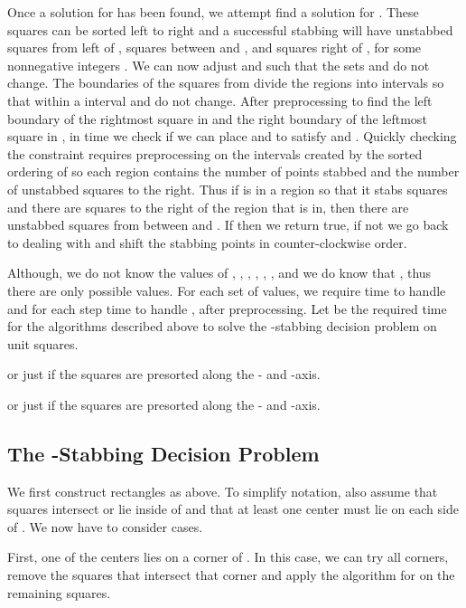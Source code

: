 \documentclass[11pt]{myclass}
\begin{document}
Once a solution for  has been found, we attempt find a solution for .  These squares can be sorted left to right and a successful stabbing will have  unstabbed squares from  left of ,  squares between  and , and  squares right of , for some nonnegative integers .  We can now adjust  and  such that the sets  and  do not change.  The boundaries of the squares from  divide the regions into intervals so that within a interval  and  do not change.  After preprocessing to find the left boundary of the rightmost square in  and the right boundary of the leftmost square in , in  time we check if we can place  and  to satisfy  and .  
Quickly checking the  constraint requires preprocessing on the intervals created by the sorted ordering of  so each region contains the number of points stabbed and the number of unstabbed squares to the right.  Thus if  is in a region so that it stabs  squares and there are  squares to the right of the region that  is in, then there are  unstabbed squares from  between  and .  If  then we return true, if not we go back to dealing with  and shift the stabbing points in counter-clockwise order.  

Although, we do not know the values of , , , , , , and  we do know that , thus there are only  possible values.  
For each set of values, we require  time to handle  and for each step  time to handle , after preprocessing.   
Let  be the required time for the algorithms described above to solve the -stabbing decision problem on  unit squares.  

\begin{lemma}
 or just  if the squares are presorted along the - and -axis.  
\end{lemma}

\begin{theorem}
 or just  if the squares are presorted along the - and -axis.  
\label{thm:rect4-dec}
\end{theorem}

\subsection{The -Stabbing Decision Problem}
We first construct  rectangles  as above.  To simplify notation, also assume that  squares intersect or lie inside of  and that at least one center must lie on each side of .  We now have to consider  cases.  

First, one of the centers lies on a corner of .  In this case, we can try all corners, remove the squares that intersect that corner and apply the algorithm for  on the remaining squares.  
\end{document}
